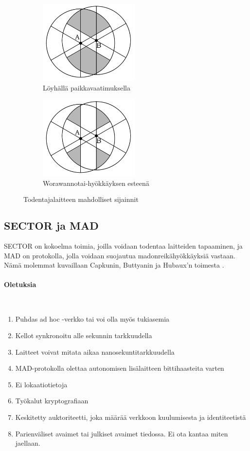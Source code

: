 \documentclass[finnish]{tktltiki2}
\theoremstyle{definition}
\theoremstyle{remark}
\begin{document}
\begin{figure}[ht]
\begin{subfigure}{.5\textwidth}
  \centering
  \includegraphics[width=5cm]{verifier-loose}
  \caption{Löyhällä paikkavaatimuksella}
  \label{fig:sub1}
\end{subfigure}%
\begin{subfigure}{.5\textwidth}
  \centering
  \includegraphics[width=5cm]{verifier-strict}
  \caption{Worawannotai-hyökkäyksen esteenä}
  \label{fig:sub2}
\end{subfigure}%
\caption{Todentajalaitteen mahdolliset sijainnit}
\label{fig:test}
\end{figure}

\newpage

\subsection{SECTOR ja MAD}

SECTOR on kokoelma toimia, joilla voidaan todentaa laitteiden tapaaminen, ja MAD on protokolla, jolla voidaan suojautua madonreikähyökkäyksiä vastaan. Nämä molemmat kuvaillaan Capkunin, Buttyanin ja Hubaux'n toimesta \cite{sector}.

\paragraph{Oletuksia}
\noindent \\

\begin{enumerate}
\item{Puhdas ad hoc -verkko tai voi olla myös tukiasemia}
\item{Kellot synkronoitu alle sekunnin tarkkuudella}
\item{Laitteet voivat mitata aikaa nanosekuntitarkkuudella}
\item{MAD-protokolla olettaa autonomisen lisälaitteen bittihaasteita varten}
\item{Ei lokaatiotietoja}
\item{Työkalut kryptografiaan}
\item{Keskitetty auktoriteetti, joka määrää verkkoon kuulumisesta ja identiteetistä}
\item{Parienväliset avaimet tai julkiset avaimet tiedossa. Ei ota kantaa miten jaellaan.}
\end{enumerate}
\end{document}
